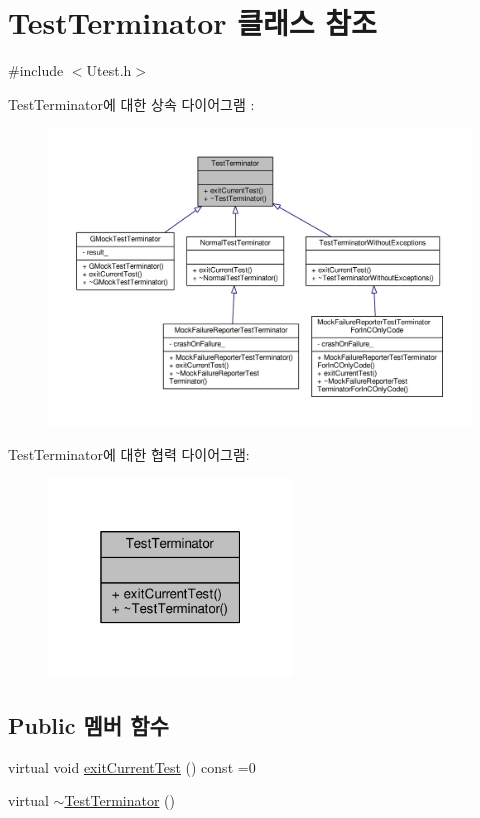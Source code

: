 \hypertarget{class_test_terminator}{}\section{Test\+Terminator 클래스 참조}
\label{class_test_terminator}


{\ttfamily \#include $<$Utest.\+h$>$}



Test\+Terminator에 대한 상속 다이어그램 \+: 
\nopagebreak
\begin{figure}[H]
\begin{center}
\leavevmode
\includegraphics[width=350pt]{class_test_terminator__inherit__graph}
\end{center}
\end{figure}


Test\+Terminator에 대한 협력 다이어그램\+:
\nopagebreak
\begin{figure}[H]
\begin{center}
\leavevmode
\includegraphics[width=184pt]{class_test_terminator__coll__graph}
\end{center}
\end{figure}
\subsection*{Public 멤버 함수}
\begin{DoxyCompactItemize}
\item 
virtual void \hyperlink{class_test_terminator_a57ed831fce5fb42abbfaf37b392eaa2f}{exit\+Current\+Test} () const =0
\item 
virtual \hyperlink{class_test_terminator_aa02cb6e39338571794d43ddf7571839b}{$\sim$\+Test\+Terminator} ()
\end{DoxyCompactItemize}



